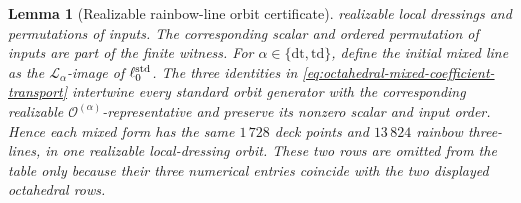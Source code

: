 \documentclass[11pt,letterpaper,onecolumn]{article}
\theoremstyle{plain}
\newtheorem{lemma}[lemma]{Lemma}
\theoremstyle{definition}
\theoremstyle{remark}
\newcommand{\OctForm}[1]{{\mathcal O^{(#1)}}}
\begin{document}
\begin{lemma}[Realizable rainbow-line orbit certificate]
realizable local dressings and permutations of inputs.
The corresponding scalar and ordered permutation of inputs are part of the
finite witness. 
For \(\alpha\in\{\mathrm{dt},\mathrm{td}\}\), define the initial mixed line as the
\(\mathcal L_\alpha\)-image of \(\ell_0^{\rm std}\).  The three identities in
\cref{eq:octahedral-mixed-coefficient-transport} intertwine every standard
orbit generator with the corresponding realizable
\(\OctForm{\alpha}\)-representative and preserve its nonzero scalar and input order.  Hence each mixed form has the same \(1\,728\) deck points and
\(13\,824\) rainbow three-lines, in one realizable local-dressing orbit.  These
two rows are omitted from the table only because their three numerical
entries coincide with the two displayed octahedral rows.
\end{lemma}
\end{document}
